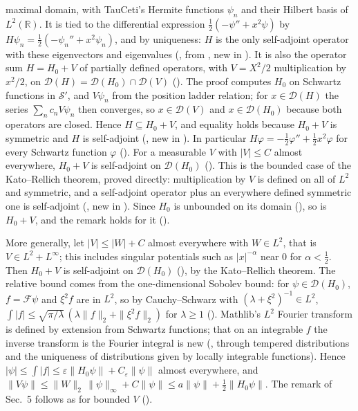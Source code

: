 \documentclass[11pt]{article}
\begin{document}
\begin{itemize}
  maximal domain, with TauCeti's Hermite functions $\psi_n$ and their Hilbert basis of
  $L^2(\mathbb{R})$. It is tied to the differential expression $\tfrac12(-\psi'' + x^2\psi)$
  by $H\psi_n = \tfrac12(-\psi_n'' + x^2\psi_n)$, and by uniqueness: $H$ is the only
  self-adjoint operator with these eigenvectors and eigenvalues (,
  from , new in ). It is also the operator sum
  $H = H_0 + V$ of partially defined operators, with $V = X^2/2$ multiplication by $x^2/2$,
  on $\mathcal{D}(H) = \mathcal{D}(H_0) \cap \mathcal{D}(V)$
  (). The proof computes $H_0$ on Schwartz functions in
  $\mathcal{S}'$, and $V\psi_n$ from the position ladder relation; for $x \in \mathcal{D}(H)$
  the series $\sum_n c_n V\psi_n$ then converges, so $x \in \mathcal{D}(V)$ and
  $x \in \mathcal{D}(H_0)$ because both operators are closed. Hence $H \subseteq H_0 + V$, and
  equality holds because $H_0 + V$ is symmetric and $H$ is self-adjoint
  (, new in ). In particular
  $H\varphi = -\tfrac12\varphi'' + \tfrac12 x^2\varphi$ for every Schwartz function $\varphi$
  (). For a measurable $V$ with $|V| \le C$ almost
  everywhere, $H_0 + V$ is self-adjoint on $\mathcal{D}(H_0)$
  (). This is the bounded case of the Kato--Rellich
  theorem, proved directly: multiplication by $V$ is defined on all of $L^2$ and symmetric, and
  a self-adjoint operator plus an everywhere defined symmetric one is self-adjoint
  (, new in ). Since $H_0$ is unbounded on its domain
  (), so is $H_0 + V$, and the remark holds for it
  ().

  More generally, let $|V| \le |W| + C$ almost everywhere with $W \in L^2$, that is
  $V \in L^2 + L^\infty$; this includes singular potentials such as $|x|^{-\alpha}$ near $0$ for
  $\alpha < \tfrac12$. Then $H_0 + V$ is self-adjoint on $\mathcal{D}(H_0)$
  (), by the Kato--Rellich theorem. The
  relative bound comes from the one-dimensional Sobolev bound: for $\psi \in \mathcal{D}(H_0)$,
  $f = \mathcal{F}\psi$ and $\xi^2 f$ are in $L^2$, so by Cauchy--Schwarz with
  $(\lambda + \xi^2)^{-1} \in L^2$, $\int|f| \le \sqrt{\pi/\lambda}\,(\lambda\|f\|_2 +
  \|\xi^2 f\|_2)$ for $\lambda \ge 1$ (). Mathlib's
  $L^2$ Fourier transform is defined by extension from Schwartz functions; that on an
  integrable $f$ the inverse transform is the Fourier integral is new
  (, through tempered distributions and the
  uniqueness of distributions given by locally integrable functions). Hence
  $|\psi| \le \int|f| \le \varepsilon\|H_0\psi\| + C_\varepsilon\|\psi\|$ almost everywhere,
  and $\|V\psi\| \le \|W\|_2\,\|\psi\|_\infty + C\|\psi\| \le a\|\psi\| + \tfrac12\|H_0\psi\|$.
  The remark of Sec.~5 follows as for bounded $V$ ().


\end{itemize}
\end{document}
